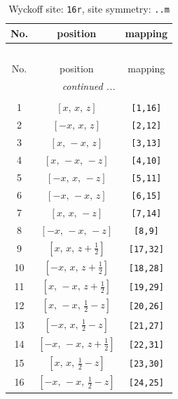 \documentclass[fleqn,8pt]{jsarticle}
\begin{document}
\renewcommand{\arraystretch}{1.2}
\begin{longtable}{ccc}
\caption{Wyckoff site: {\tt 16r}, site symmetry: {\tt ..m}}
 \\
 \hline \hline
No. & position & mapping \\ \hline \endfirsthead

\multicolumn{2}{l}{\tablename\ \thetable{}} \\
 \hline \hline
No. & position & mapping \\ \hline \endhead

 \hline \hline
\multicolumn{2}{r}{\footnotesize\it continued ...} \\ \endfoot

 \hline \hline
\multicolumn{2}{r}{} \\ \endlastfoot

1 & $\left[ x,\, x,\, z \right]$ & {\tt [1,16]} \\ \hline
2 & $\left[ - x,\, x,\, z \right]$ & {\tt [2,12]} \\ \hline
3 & $\left[ x,\, - x,\, z \right]$ & {\tt [3,13]} \\ \hline
4 & $\left[ x,\, - x,\, - z \right]$ & {\tt [4,10]} \\ \hline
5 & $\left[ - x,\, x,\, - z \right]$ & {\tt [5,11]} \\ \hline
6 & $\left[ - x,\, - x,\, z \right]$ & {\tt [6,15]} \\ \hline
7 & $\left[ x,\, x,\, - z \right]$ & {\tt [7,14]} \\ \hline
8 & $\left[ - x,\, - x,\, - z \right]$ & {\tt [8,9]} \\ \hline
9 & $\left[ x,\, x,\, z + \frac{1}{2} \right]$ & {\tt [17,32]} \\ \hline
10 & $\left[ - x,\, x,\, z + \frac{1}{2} \right]$ & {\tt [18,28]} \\ \hline
11 & $\left[ x,\, - x,\, z + \frac{1}{2} \right]$ & {\tt [19,29]} \\ \hline
12 & $\left[ x,\, - x,\, \frac{1}{2} - z \right]$ & {\tt [20,26]} \\ \hline
13 & $\left[ - x,\, x,\, \frac{1}{2} - z \right]$ & {\tt [21,27]} \\ \hline
14 & $\left[ - x,\, - x,\, z + \frac{1}{2} \right]$ & {\tt [22,31]} \\ \hline
15 & $\left[ x,\, x,\, \frac{1}{2} - z \right]$ & {\tt [23,30]} \\ \hline
16 & $\left[ - x,\, - x,\, \frac{1}{2} - z \right]$ & {\tt [24,25]} \\
\end{longtable}
\end{document}
